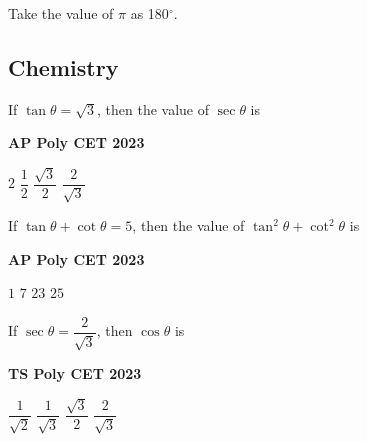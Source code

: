 \documentclass[11pt,paper=a4,answers]{exam}
\begin{document}
\begin{center}
\Large{Take the value of $\pi$ as 180${^\circ}$.}
\end{center}

\newpage















\subsection*{Chemistry}
\begin{multicols}{2}
\begin{questions}
\question
If $\tan  \theta = \sqrt{3}$, then the value of $\sec \theta$ is
\begin{flushright}
\small\textbf{AP Poly CET 2023}
\end{flushright}


\begin{choices}
\choice $\displaystyle 2$ 
\choice $\displaystyle \dfrac{1}{2}$ 
\choice $\displaystyle \dfrac{\sqrt{3}}{2}$ 
\choice $\displaystyle \dfrac{2}{\sqrt{3}}$  
\end{choices}






\question If $\tan  \theta + \cot \theta = 5$, then the value of $\tan^2  \theta + \cot^2 \theta $ is
\begin{flushright}
\small\textbf{AP Poly CET 2023}
\end{flushright}

\begin{choices}
\choice $\displaystyle 1$ 
\choice $\displaystyle 7$ 
\choice $\displaystyle 23$ 
\choice $\displaystyle 25$  
\end{choices}
\question If $\displaystyle \sec  \theta = \dfrac{2}{\sqrt{3}}$, then $\cos \theta$ is
\begin{flushright}
\small\textbf{TS Poly CET 2023}
\end{flushright}


\begin{choices}
\choice $\displaystyle \dfrac{1}{\sqrt{2}}$ 
\choice $\displaystyle \dfrac{1}{\sqrt{3}}$ 
\choice $\displaystyle \dfrac{\sqrt{3}}{2}$ 
\choice $\displaystyle \dfrac{2}{\sqrt{3}}$   
\end{choices}



\end{questions}
\end{multicols}
\end{document}
